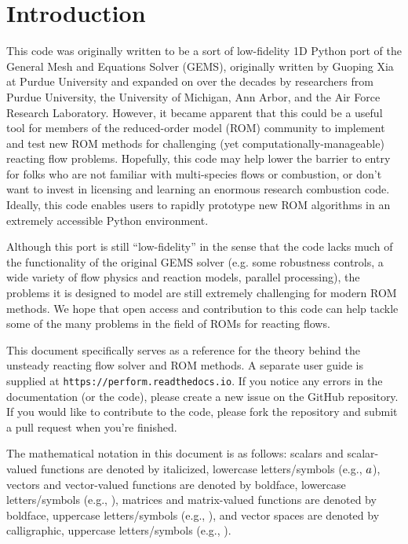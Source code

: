 \newpage
\section{Introduction}

This code was originally written to be a sort of low-fidelity 1D Python port of the General Mesh and Equations Solver (GEMS), originally written by Guoping Xia at Purdue University and expanded on over the decades by researchers from Purdue University, the University of Michigan, Ann Arbor, and the Air Force Research Laboratory. However, it became apparent that this could be a useful tool for members of the reduced-order model (ROM) community to implement and test new ROM methods for challenging (yet computationally-manageable) reacting flow problems. Hopefully, this code may help lower the barrier to entry for folks who are not familiar with multi-species flows or combustion, or don't want to invest in licensing and learning an enormous research combustion code. Ideally, this code enables users to rapidly prototype new ROM algorithms in an extremely accessible Python environment.

Although this port is still ``low-fidelity'' in the sense that the code lacks much of the functionality of the original GEMS solver (e.g. some robustness controls, a wide variety of flow physics and reaction models, parallel processing), the problems it is designed to model are still extremely challenging for modern ROM methods. We hope that open access and contribution to this code can help tackle some of the many problems in the field of ROMs for reacting flows.

This document specifically serves as a reference for the theory behind the unsteady reacting flow solver and ROM methods. A separate user guide is supplied at \texttt{https://perform.readthedocs.io}. If you notice any errors in the documentation (or the code), please create a new issue on the GitHub repository. If you would like to contribute to the code, please fork the repository and submit a pull request when you're finished.

The mathematical notation in this document is as follows: scalars and scalar-valued functions are denoted by italicized, lowercase letters/symbols (e.g., $a$), vectors and vector-valued functions are denoted by boldface, lowercase letters/symbols (e.g., \dummyVec), matrices and matrix-valued functions are denoted by boldface, uppercase letters/symbols (e.g., \dummyMat), and vector spaces are denoted by calligraphic, uppercase letters/symbols (e.g., \dummySpace).

